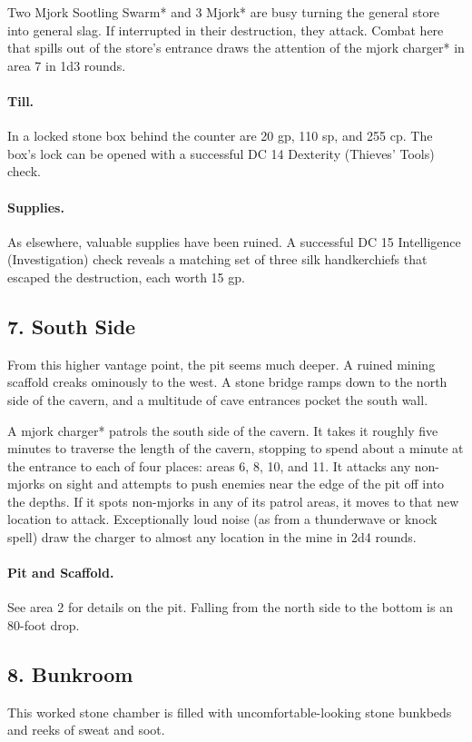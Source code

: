 \documentclass[10pt,a4paper,twoside,twocolumn,openany,bg=print,nodeprecatedcode]{dndbook}
\begin{document}
Two Mjork Sootling Swarm* and 3 Mjork* are busy turning the general store into general slag. If interrupted in their destruction, they attack. Combat here that spills out of the store's entrance draws the attention of the mjork charger* in area 7 in 1d3 rounds.
\paragraph{Till.}
In a locked stone box behind the counter are 20 gp, 110 sp, and 255 cp. The box's lock can be opened with a successful DC 14 Dexterity (Thieves' Tools) check.
\paragraph{Supplies.}
As elsewhere, valuable supplies have been ruined. A successful DC 15 Intelligence (Investigation) check reveals a matching set of three silk handkerchiefs that escaped the destruction, each worth 15 gp.
\subsection{7. South Side}
\begin{DndReadAloud}{}
From this higher vantage point, the pit seems much deeper. A ruined mining scaffold creaks ominously to the west. A stone bridge ramps down to the north side of the cavern, and a multitude of cave entrances pocket the south wall.
\end{DndReadAloud}

A mjork charger* patrols the south side of the cavern. It takes it roughly five minutes to traverse the length of the cavern, stopping to spend about a minute at the entrance to each of four places: areas 6, 8, 10, and 11. It attacks any non-mjorks on sight and attempts to push enemies near the edge of the pit off into the depths. If it spots non-mjorks in any of its patrol areas, it moves to that new location to attack. Exceptionally loud noise (as from a thunderwave or knock spell) draw the charger to almost any location in the mine in 2d4 rounds.
\paragraph{Pit and Scaffold.}
See area 2 for details on the pit. Falling from the north side to the bottom is an 80-foot drop.
\subsection{8. Bunkroom}
\begin{DndReadAloud}{}
This worked stone chamber is filled with uncomfortable-looking stone bunkbeds and reeks of sweat and soot.
\end{DndReadAloud}
\end{document}
